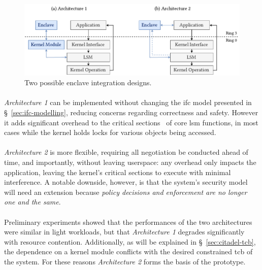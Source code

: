 \begin{figure}[]
    \centering
    \includegraphics[width=0.98\linewidth]{figures/SGX-EnclaveIntegration-Design}
    \caption{Two possible enclave integration designs.}
    \vspace{2mm}
    \label{fig:sgx-integration}
    \vspace{5mm}
\end{figure}

\paragraph{}\textit{Architecture 1} can be implemented without changing the \acrshort{ifc} model presented in §~\ref{sec:ifc-modelling}, reducing concerns regarding correctness and safety. However it adds significant overhead to the critical sections~\cite{Dubois1988SynchronizationCA} of core \acrshort{lsm} functions, in most cases while the kernel holds locks for various objects being accessed.

\paragraph{} \textit{Architecture 2} is more flexible, requiring all negotiation be conducted ahead of time, and importantly, without leaving userspace: any overhead only impacts the application, leaving the kernel's critical sections to execute with minimal interference. A notable downside, however, is that the system's security model will need an extension because \textit{policy decisions and enforcement are no longer one and the same}.

\paragraph{} Preliminary experiments showed that the performances of the two architectures were similar in light workloads, but that \textit{Architecture 1} degrades significantly with resource contention. Additionally, as will be explained in §~\ref{sec:citadel-tcb}, the dependence on a kernel module conflicts with the desired constrained \acrshort{tcb} of the system. For these reasons \textit{Architecture 2} forms the basis of the prototype.

